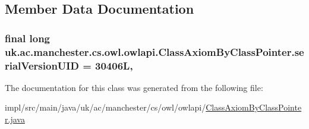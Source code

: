 \subsection{Member Data Documentation}
\hypertarget{classuk_1_1ac_1_1manchester_1_1cs_1_1owl_1_1owlapi_1_1_class_axiom_by_class_pointer_a4d71d0640de32ef58ea38c20320fe23e}{
\subsubsection[{serial\-Version\-U\-I\-D}]{\setlength{\rightskip}{0pt plus 5cm}final long uk.\-ac.\-manchester.\-cs.\-owl.\-owlapi.\-Class\-Axiom\-By\-Class\-Pointer.\-serial\-Version\-U\-I\-D = 30406\-L\hspace{0.3cm}{\ttfamily [static]}, {\ttfamily [private]}}}\label{classuk_1_1ac_1_1manchester_1_1cs_1_1owl_1_1owlapi_1_1_class_axiom_by_class_pointer_a4d71d0640de32ef58ea38c20320fe23e}


The documentation for this class was generated from the following file\-:\begin{DoxyCompactItemize}
\item 
impl/src/main/java/uk/ac/manchester/cs/owl/owlapi/\hyperlink{_class_axiom_by_class_pointer_8java}{Class\-Axiom\-By\-Class\-Pointer.\-java}\end{DoxyCompactItemize}
